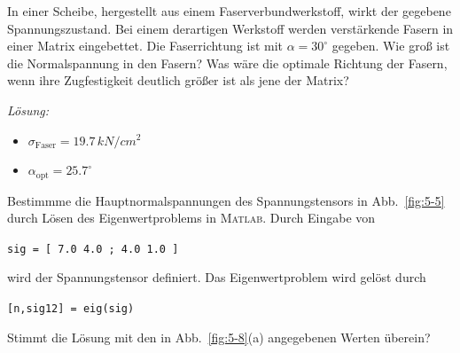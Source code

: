 \begin{example}
	In einer Scheibe, hergestellt aus einem Faserverbundwerkstoff, wirkt der gegebene Spannungszustand.
	Bei einem derartigen Werkstoff werden verstärkende Fasern in einer Matrix eingebettet.
	Die Faserrichtung ist mit $\alpha=30^\circ$ gegeben.
	Wie groß ist die Normalspannung in den Fasern?
	Was wäre die optimale Richtung der Fasern, wenn ihre Zugfestigkeit deutlich größer ist als jene der Matrix?
	\begin{center}
		
	\end{center}
	
	\textit{Lösung:}
	\begin{itemize}
		\item $\sigma_{\text{Faser}} = 19.7\,\unit{kN/cm^2}$
		\item $\alpha_{\text{opt}} = 25.7^\circ$
	\end{itemize}
\end{example}

\begin{example}
	Bestimmme die Hauptnormalspannungen des Spannungstensors in Abb.~\ref{fig:5-5} durch Lösen des Eigenwertproblems in \textsc{Matlab}.
	Durch Eingabe von
	\begin{center}
		\texttt{sig = [ 7.0   4.0 ; 4.0   1.0 ]}
	\end{center}
	wird der Spannungstensor definiert.
	Das Eigenwertproblem wird gelöst durch 
	\begin{center}
		\texttt{[n,sig12] = eig(sig)} 
	\end{center}
	Stimmt die Lösung mit den in Abb.~\ref{fig:5-8}(a) angegebenen Werten überein?
\end{example}


